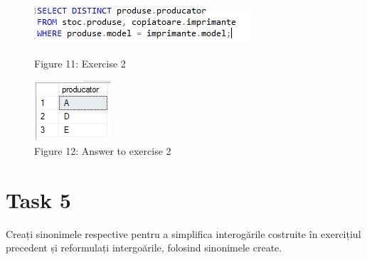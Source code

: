 \begin{enumerate}
\begin{figure}[H]
	\centering
		\includegraphics[width=\linewidth]{screens/12.jpg}
		\caption*{Figure 11: Exercise 2}
		\label{}
	\endminipage\hfill
		\includegraphics[width=\linewidth]{screens/12ans.jpg}
		\caption*{Figure 12: Answer to exercise 2}
	\endminipage
\end{figure}
\end{enumerate}


\section{Task 5}
Creați sinonimele respective pentru a simplifica interogările costruite în exercițiul precedent și reformulați intergoările, folosind sinonimele create.

